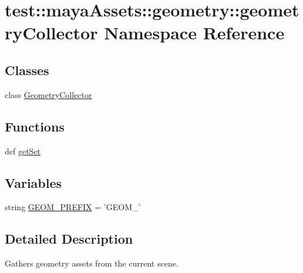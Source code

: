 \hypertarget{namespacetest_1_1mayaAssets_1_1geometry_1_1geometryCollector}{\section{test\-:\-:maya\-Assets\-:\-:geometry\-:\-:geometry\-Collector \-Namespace \-Reference}
\label{d3/dbb/namespacetest_1_1mayaAssets_1_1geometry_1_1geometryCollector}
}
\subsection*{\-Classes}
\begin{DoxyCompactItemize}
\item 
class \hyperlink{classtest_1_1mayaAssets_1_1geometry_1_1geometryCollector_1_1GeometryCollector}{\-Geometry\-Collector}
\end{DoxyCompactItemize}
\subsection*{\-Functions}
\begin{DoxyCompactItemize}
\item 
def \hyperlink{namespacetest_1_1mayaAssets_1_1geometry_1_1geometryCollector_a6643869205d215b35b646183348eb198}{get\-Set}
\end{DoxyCompactItemize}
\subsection*{\-Variables}
\begin{DoxyCompactItemize}
\item 
string \hyperlink{namespacetest_1_1mayaAssets_1_1geometry_1_1geometryCollector_afe2424cd8bbd96dc17e1e41299b4fa41}{\-G\-E\-O\-M\-\_\-\-P\-R\-E\-F\-I\-X} = '\-G\-E\-O\-M\-\_\-'
\end{DoxyCompactItemize}


\subsection{\-Detailed \-Description}
\begin{DoxyVerb}
Gathers geometry assets from the current scene.
\end{DoxyVerb}
 

